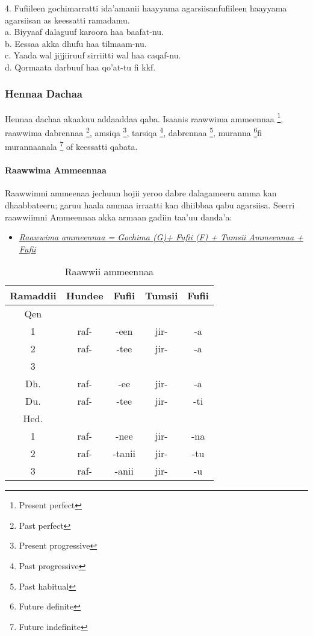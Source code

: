 \documentclass[11pt,b5paper]{book}
\begin{document}
4. Fufiileen gochimarratti ida’amanii haayyama agarsiisanfufiileen haayyama agarsiisan as keessatti ramadamu. \\
a. Biyyaaf dalaguuf karoora haa baafat-nu.\\
b. Eessaa akka dhufu haa tilmaam-nu.\\
c. Yaada wal jijjiiruuf sirriitti wal haa caqaf-nu.\\
d. Qormaata darbuuf haa qo’at-tu fi kkf.

\subsubsection{Hennaa Dachaa}
Hennaa dachaa akaakuu addaaddaa qaba. Isaanis raawwima ammeennaa \footnote{Present perfect}, raawwima dabrennaa \footnote{Past perfect}, amsiqa \footnote{Present progressive}, tarsiqa \footnote{Past progressive}, dabrennaa \footnote{Past habitual}, muranna \footnote{Future definite}fi murannaanala \footnote{Future indefinite} of keessatti qabata.

\paragraph{Raawwima Ammeennaa}
Raawwimni ammeenaa jechuun hojii yeroo dabre dalagameeru amma kan dhaabbateeru; garuu haala ammaa irraatti kan
dhiibbaa qabu agarsiisa. Seerri raawwiimni Ammeennaa akka armaan gadiin taa'uu danda'a:\\
\begin{itemize}
	\item \textit{\underline{Raawwima ammeennaa = Gochima (G)+ Fufii (F) + Tumsii Ammeennaa + Fufii}}
\end{itemize}
\begin{table}[H]
	\centering
	\caption{Raawwii ammeennaa}
	\begin{tabular}{ccccc}
		\hline\hline
		Ramaddii & Hundee & Fufii & Tumsii & Fufii \\
		\hline
		Qen &  &  &  &  \\
		1	& raf- & -een & jir- & -a		\\
		2	& raf- & -tee & jir- & -a	\\
		3 \\
		Dh.	& raf- & -ee & jir- & -a		\\
		Du.	& raf- & -tee & jir- & -ti		\\
		\hline
		Hed. \\
		1   & raf- & -nee & jir- & -na     \\
		2   & raf- & -tanii & jir- & -tu      \\
		3   & raf- & -anii & jir- & -u      \\
		\hline
		
	\end{tabular}
\end{table}
\end{document}
